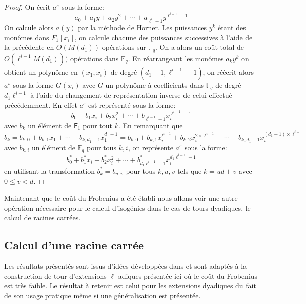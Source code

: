 \documentclass[10pt,a4paper]{book}
\theoremstyle{plain}
\theoremstyle{definition}
\theoremstyle{definition}
\theoremstyle{definition}
\theoremstyle{definition}
\theoremstyle{remark}
\theoremstyle{remark}
\theoremstyle{definition}
\begin{document}
\begin{proof}
On écrit $a^s$ sous la forme:
\begin{equation*}
a_0 + a_1 y + a_2 y^2 + \cdots + a_{\ell^i-1}y^{\ell^{i-1}-1}
\end{equation*}
On calcule alors $a(y)$ par la méthode de Horner. Les puissances $y^k$ étant des monômes dans $F_1[x_i]$, on calcule chacune des puissances successives à l'aide de la précédente en $O(M(d_1))$ opérations sur $\mathbb{F}_q$. On a alors un coût total de $O(\ell^{i-1}M(d_1)))$ opérations dans $\mathbb{F}_q$. En réarrangeant les monômes $a_k y^k$ on obtient un polynôme en $(x_1,x_i)$ de degré $(d_1-1,\ell^{i-1}-1)$, on réécrit alors $a^s$ sous la forme $G(x_i)$ avec $G$ un polynôme à coefficients dans $\mathbb{F}_q$ de degré $d_1\ell^{i-1}$  à l'aide du changement de représentation inverse de celui effectué précédemment. En effet $a^s$ est représenté sous la forme:
\begin{equation*}
b_0 + b_1 x_i + b_2 x_i^2 + \cdots + b_{\ell^{i-1}-1}x_i^{\ell^{i-1}-1}
\end{equation*}
avec $b_k$ un élément de $\mathsf{F}_1$ pour tout $k$. En remarquant que
\begin{equation*}
 b_k=b_{k,0} + b_{k,1}x_1 + \cdots + b_{k,d_1-1} x_1^{d_1-1}=b_{k,0} + b_{k,1}x_i^{\ell^{i-1}} + b_{k,2} x_i^{2 \times \ell^{i-1}} + \cdots + b_{k,d_1-1} x_i^{(d_1-1)\times \ell^{i-1}} 
\end{equation*}
 avec $b_{k,i}$ un élément de $\mathbb{F}_q$ pour tous $k,i$, on représente $a^s$ sous la forme:
\begin{equation*}
b_0^* + b_1^* x_i + b^*_2 x_i^2 + \cdots + b^*_{d_1\ell^{i-1}-1} x_i^{d_1\ell^{i-1}-1}
\end{equation*}
 en  utilisant la transformation $b_k^*=b_{u,v}$ pour tous $k,u,v$ tels que $k=ud+v$ avec $0 \leqslant v < d$.
\end{proof}

Maintenant que le coût du Frobenius a été établi nous allons voir une autre opération nécessaire pour le calcul d'isogénies dans le cas de tours dyadiques, le calcul de racines carrées.

\subsection*{Calcul d'une racine carrée}
Les résultats présentés sont issus d'idées développées dans \cite{Doliskani-Schost14} et sont adaptés à la construction de tour d'extensions $\ell$-adiques présentée ici où le coût du Frobenius est très faible. Le résultat à retenir est celui pour les extensions dyadiques du fait de son usage pratique même si une généralisation est présentée. 
\end{document}
